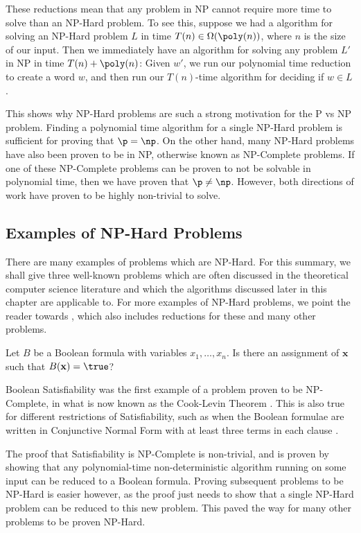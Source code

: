 These reductions mean that any problem in NP cannot require more time to solve than an NP-Hard problem. To see this, suppose we had a algorithm for solving an NP-Hard problem $L$ in time $T(n) \in \Omega(\poly(n))$, where $n$ is the size of our input. Then we immediately have an algorithm for solving any problem $L'$ in NP in time $T(n)+\poly(n)$: Given $w'$, we run our polynomial time reduction to create a word $w$, and then run our $T(n)$-time algorithm for deciding if $w \in L$.

This shows why NP-Hard problems are such a strong motivation for the P vs NP problem. Finding a polynomial time algorithm for a single NP-Hard problem is sufficient for proving that $\p = \np$. On the other hand, many NP-Hard problems have also been proven to be in NP, otherwise known as NP-Complete problems. If one of these NP-Complete problems can be proven to not be solvable in polynomial time, then we have proven that $\p \neq \np$. However, both directions of work have proven to be highly non-trivial to solve.

\subsection{Examples of NP-Hard Problems}

There are many examples of problems which are NP-Hard. For this summary, we shall give three well-known problems which are often discussed in the theoretical computer science literature and which the algorithms discussed later in this chapter are applicable to. For more examples of NP-Hard problems, we point the reader towards \cite{karp1972, garey1979}, which also includes reductions for these and many other problems.

\begin{problem}
Let $B$ be a Boolean formula with variables $x_1,\dots,x_n$. Is there an assignment of $\mathbf{x}$ such that $B(\mathbf{x}) = \true$?
\end{problem}

Boolean Satisfiability was the first example of a problem proven to be NP-Complete, in what is now known as the Cook-Levin Theorem \cite{cook1971}. This is also true for different restrictions of Satisfiability, such as when the Boolean formulae are written in Conjunctive Normal Form with at least three terms in each clause \cite{karp1972}.

The proof that Satisfiability is NP-Complete is non-trivial, and is proven by showing that any polynomial-time non-deterministic algorithm running on some input can be reduced to a Boolean formula. Proving subsequent problems to be NP-Hard is easier however, as the proof just needs to show that a single NP-Hard problem can be reduced to this new problem. This paved the way for many other problems to be proven NP-Hard.

